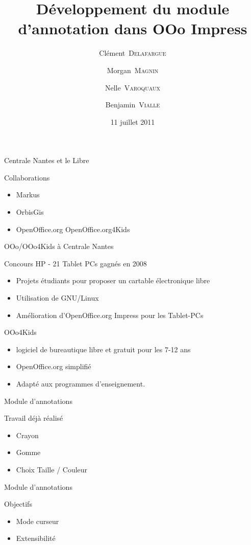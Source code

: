 \documentclass{beamer}
\title{Développement du module d'annotation dans OOo Impress}
\author{Clément~\textsc{Delafargue} \and Morgan~\textsc{Magnin} \and Nelle~\textsc{Varoquaux}\and Benjamin~\textsc{Vialle}}
\institute[\textsc{ECN}]{École Centrale de Nantes}
\date{11 juillet 2011}
\begin{document}
\frame{\titlepage}

\begin{frame}{Centrale Nantes et le Libre}
	\begin{block}{Collaborations}
		\begin{itemize}[<+->]
			\item Markus
			\item OrbisGis
			\item OpenOffice.org OpenOffice.org4Kids
		\end{itemize}
	\end{block}
\end{frame}

\begin{frame}{OOo/OOo4Kids à Centrale Nantes}
	\begin{block}{Concours HP - 21 Tablet PCs gagnés en 2008}
		\begin{itemize}[<+->]
            \item Projets étudiants pour proposer un cartable électronique libre
            \item Utilisation de GNU/Linux
            \item Amélioration d'OpenOffice.org Impress pour les Tablet-PCs
		\end{itemize}
	\end{block}
    \pause{}
	\begin{block}{OOo4Kids}
		\begin{itemize}[<+->]
            \item logiciel de bureautique libre et gratuit pour les 7-12 ans
            \item OpenOffice.org simplifié
            \item Adapté aux programmes d'enseignement.
		\end{itemize}
	\end{block}
\end{frame}

\begin{frame}{Module d'annotations}
    \begin{block}{Travail déjà réalisé}
        \begin{itemize}[<+->]
            \item Crayon
            \item Gomme
            \item Choix Taille / Couleur
        \end{itemize}
    \end{block}
\end{frame}
\begin{frame}{Module d'annotations}
    \begin{block}{Objectifs}
        \begin{itemize}[<+->]
            \item Mode curseur
            \item Extensibilité
        \end{itemize}
    \end{block}
\end{frame}
\end{document}
